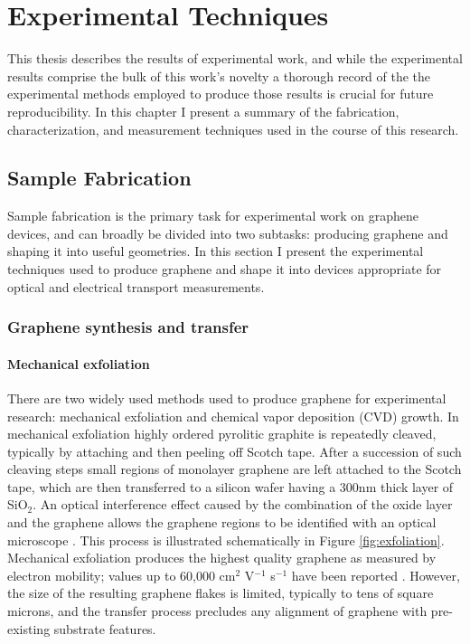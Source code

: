 \documentclass[edeposit,fullpage,draftthesis]{uiucthesis2009}
\begin{document}
\chapter{Experimental Techniques}

    This thesis describes the results of experimental work, and while the experimental results comprise the bulk
    of this work's novelty a thorough record of the the experimental methods employed to produce those results 
    is crucial for future reproducibility.
    In this chapter I present a summary of the fabrication, characterization, and measurement techniques used
    in the course of this research.
    
    \section{Sample Fabrication}
    
        Sample fabrication is the primary task for experimental work on graphene devices, 
        and can broadly be divided into two subtasks: producing graphene and shaping it into useful geometries.
        In this section I present the experimental techniques used to produce graphene
        and shape it into devices appropriate for optical and electrical transport measurements.
    
        \subsection{Graphene synthesis and transfer}
        
        
            \subsubsection{Mechanical exfoliation}
            
            There are two widely used methods used to produce graphene for 
        experimental research: mechanical exfoliation\cite{novoselov2004electric} and chemical vapor
        deposition (CVD) growth\cite{li2009large}. In mechanical exfoliation highly ordered
        pyrolitic graphite is repeatedly cleaved, typically by attaching and 
        then peeling off Scotch tape. After a succession of such cleaving steps
        small regions of monolayer graphene are left attached to the Scotch
        tape, which are then transferred to a silicon wafer having a 300nm
        thick layer of SiO$_2$. An optical interference effect caused by the 
        combination of the oxide layer and the graphene allows the graphene
        regions to be identified with an optical microscope \cite{Blake2007}.
        This process is illustrated schematically in Figure \ref{fig:exfoliation}.
        Mechanical exfoliation produces the highest quality graphene as
        measured by electron mobility; values up to 60,000 cm$^2$ V$^{-1}$
        s$^{-1}$ have been reported \cite{Dean2010}. However, the size of the 
        resulting graphene flakes is limited, typically to tens of square
        microns, and the transfer process precludes any alignment of graphene
        with pre-existing substrate features.
        
\end{document}
